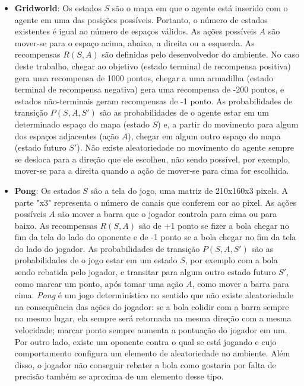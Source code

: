 \begin{itemize}
\item \textbf{Gridworld}:
Os estados $S$ são o mapa em que o agente está inserido com o agente em uma das posições possíveis.
Portanto, o número de estados existentes é igual ao número de espaços válidos.
As ações possíveis $A$ são mover-se para o espaço acima, abaixo, a direita ou a esquerda.
As recompensas $R(S,A)$ são definidas pelo desenvolvedor do ambiente.
No caso deste trabalho, chegar ao objetivo (estado terminal de recompensa positiva) gera uma recompensa de 1000 pontos, chegar a uma armadilha (estado terminal de recompensa negativa) gera uma recompensa de -200 pontos, e estados não-terminais geram recompensas de -1 ponto.
As probabilidades de transição $P(S,A,S')$ são as probabilidades de o agente estar em um determinado espaço do mapa (estado $S$) e, a partir do movimento para algum dos espaços adjacentes (ação $A$), chegar em algum outro espaço do mapa (estado futuro $S'$).
Não existe aleatoriedade no movimento do agente sempre se desloca para a direção que ele escolheu, não sendo possível, por exemplo, mover-se para a direita quando a ação de mover-se para cima for escolhida.

\item \textbf{Pong}:
Os estados $S$ são a tela do jogo, uma matriz de 210x160x3 pixels.
A parte "x3"{} representa o número de canais que conferem cor ao pixel.
As ações possíveis $A$ são mover a barra que o jogador controla para cima ou para baixo.
As recompensas $R(S,A)$ são de +1 ponto se fizer a bola chegar no fim da tela do lado do oponente e de -1 ponto se a bola chegar no fim da tela do lado do jogador.
As probabilidades de transição $P(S,A,S')$ são as probabilidades de o jogo estar em um estado $S$, por exemplo com a bola sendo rebatida pelo jogador, e transitar para algum outro estado futuro $S'$, como marcar um ponto, após tomar uma ação $A$, como mover a barra para cima.
\textit{Pong} é um jogo determinístico no sentido que não existe aleatoriedade na consequência das ações do jogador: se a bola colidir com a barra sempre no mesmo lugar, ela sempre será retornada na mesma direção com a mesma velocidade; marcar ponto sempre aumenta a pontuação do jogador em um.
Por outro lado, existe um oponente contra o qual se está jogando e cujo comportamento configura um elemento de aleatoriedade no ambiente.
Além disso, o jogador não conseguir rebater a bola como gostaria por falta de precisão também se aproxima de um elemento desse tipo.


\end{itemize}
